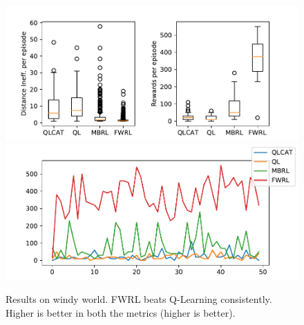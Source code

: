 \begin{figure}
\includegraphics[width=\columnwidth]{./media/metrics-windy-world.pdf}\\%
\includegraphics[width=\columnwidth]{./media/rewards-metrics-windy-world.pdf}
\caption{Results on windy world. FWRL beats Q-Learning consistently. Higher is
  better in both the metrics (higher is better).}
\label{fig:ql-fw-windy-world-results}%
\end{figure}

